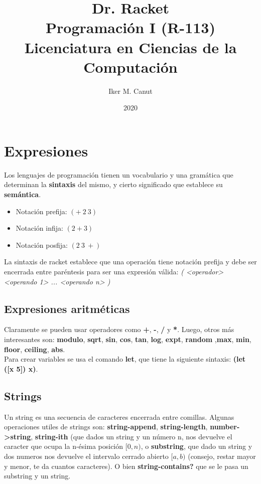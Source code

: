 \documentclass[11pt,a4paper]{article}
\begin{document}
\title{Dr. Racket\\Programaci\'on I (R-113)\\Licenciatura en Ciencias de la Computaci\'on}
\date{2020}

\author{Iker M. Canut}
\maketitle
\newpage

\section{Expresiones}
Los lenguajes de programación tienen un vocabulario y una gramática que determinan la \textbf{sintaxis} del mismo, y cierto significado que establece su \textbf{semántica}.
\begin{multicols}{3}
\begin{itemize}
\item Notación prefija: $(+\ 2\ 3)$
\item Notación infija:  $(2 + 3)$ 
\item Notación posfija: $(2\ 3\ +)$ 
\end{itemize}
\end{multicols}
\noindent La sintaxis de racket establece que una operación tiene notación prefija y debe ser encerrada entre paréntesis para ser una expresión válida: \textit{( <operador> <operando 1> ... <operando n> )}

\subsection{Expresiones aritméticas}
Claramente se pueden usar operadores como \textbf{+}, \textbf{-}, \textbf{/} y \textbf{*}. Luego, otros más interesantes son: \textbf{modulo}, \textbf{sqrt}, \textbf{sin}, \textbf{cos}, \textbf{tan}, \textbf{log}, \textbf{expt}, \textbf{random} ,\textbf{max}, \textbf{min}, \textbf{floor}, \textbf{ceiling}, \textbf{abs}.\\

\noindent Para crear variables se usa el comando \textbf{let}, que tiene la siguiente sintaxis: \textbf{(let ([x 5]) x)}.

\subsection{Strings}
Un string es una secuencia de caracteres encerrada entre comillas. Algunas operaciones utiles de strings son: \textbf{string-append}, \textbf{string-length}, \textbf{number->string}, \textbf{string-ith} (que dados un string y un n\'umero n, nos devuelve el caracter que ocupa la n-ésima posición $[0, n)$, o \textbf{substring}, que dado un string y dos numeros nos devuelve el intervalo cerrado abierto $[a,b)$ (consejo, restar mayor y menor, te da cuantos caracteres). O bien \textbf{string-contains?} que se le pasa un substring y un string.
\end{document}
